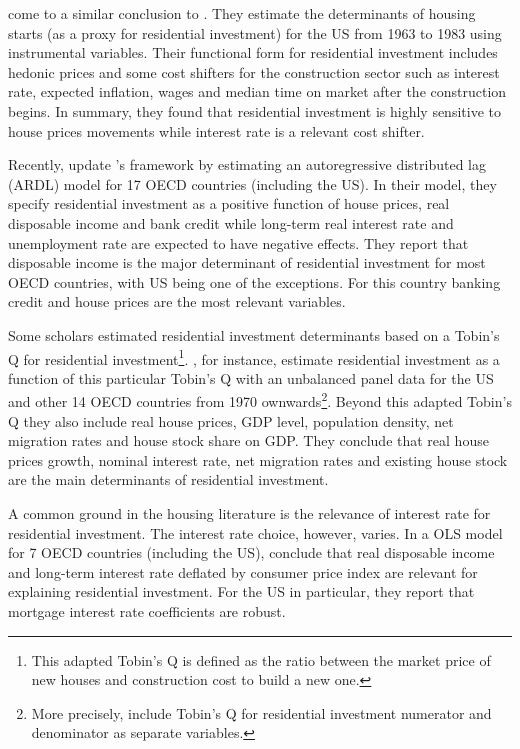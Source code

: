 \documentclass[12pt, a4paper]{article}
\begin{document}
\textcite{topel_1988_Housing} come to a similar conclusion to \textcite{poterba_tax_1984}.
They estimate the determinants of housing starts (as a proxy for residential investment) for the US from 1963 to 1983 using instrumental variables.
Their functional form for residential investment includes hedonic prices and some cost shifters for the construction sector such as interest rate, expected inflation, wages and median time on market after the construction begins.
In summary, they found that residential investment is highly sensitive to house prices movements while interest rate is a relevant cost shifter.

Recently,  \textcite{arestis_residential_2015} update \citeauthor*{poterba_tax_1984}'s \citeyear{poterba_tax_1984} framework by estimating an autoregressive distributed lag (ARDL) model for 17 OECD countries (including the US).
In their model, they specify residential investment as a positive function of house prices, real disposable income and bank credit while long-term real interest rate and unemployment rate are expected to have negative effects.
They report that disposable income is the major determinant of residential investment for most OECD countries, with US being one of the exceptions.
For this country banking credit and house prices are the most relevant variables.

Some scholars estimated residential investment determinants based on a Tobin's Q for residential investment\footnote{This adapted Tobin's Q is defined as the ratio between the market price of new houses and construction cost to build a new one.}.
\textcite{kohlscheen_2018_Residential}, for instance, estimate residential investment as a function of this particular Tobin's Q with an unbalanced panel data for the US and other 14 OECD countries from 1970 ownwards\footnote{More precisely, \textcite{kohlscheen_2018_Residential} include Tobin's Q for residential investment numerator and denominator as separate variables.}.
Beyond this adapted Tobin's Q they also include real house prices, GDP level, population density, net migration rates and house stock share on GDP.
They conclude that real house prices growth, nominal interest rate, net migration rates and existing house stock are the main determinants of residential investment.

A common ground in the housing literature is the relevance of interest rate for residential investment.
The interest rate choice, however, varies.
In a OLS model for 7 OECD countries (including the US), \textcite{egebo_1990_MODEL} conclude that real disposable income and long-term interest rate deflated by consumer price index are relevant for explaining residential investment.
For the US in particular, they report that mortgage interest rate coefficients are robust.
\end{document}
